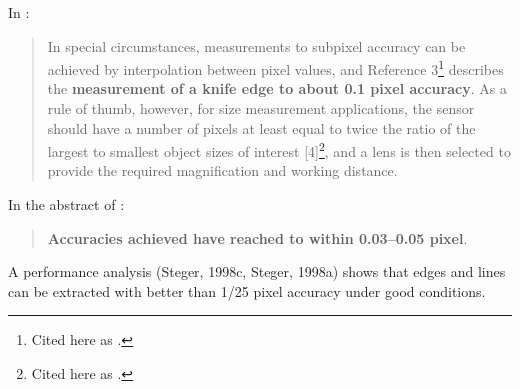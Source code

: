 \documentclass[a4paper,12pt]{article}
\begin{document}
In \cite{eren2014measurement}:
\begin{quotation}
In special circumstances, measurements to subpixel accuracy can be achieved by
interpolation between pixel values, and Reference 3\footnote{Cited here as \cite{knives}.} describes the \textbf{measurement of a knife edge to about
0.1 pixel accuracy}. As a rule of thumb, however, for size measurement applications, the sensor should
have a number of pixels at least equal to twice the ratio of the largest to smallest object sizes of interest
[4]\footnote{Cited here as \cite{hopwood1980design}.}, and a lens is then selected to provide the required magnification and working distance.
\end{quotation}

In the abstract of \cite{MIKHAIL198463}:
\begin{quotation}
\textbf{Accuracies achieved have reached to within 0.03–0.05 pixel}.
\end{quotation}

A performance analysis (Steger, 1998c, Steger, 1998a) shows that
edges and lines can be extracted with better than 1/25 pixel accuracy under good conditions.


\printbibliography
\end{document}
